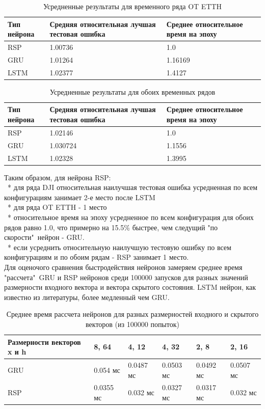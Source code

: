 \documentclass[11pt]{article}
\begin{document}
\begin{table}[H]
\caption{Усредненные результаты для временного ряда OT ETTH}
\begin{tabular}{ |p{2.2cm}|p{5cm}|p{5cm}|  }
 \hline
  Тип нейрона & Средняя относительная лучшая тестовая ошибка & Среднее относительное время на эпоху \\
  \hline
 RSP & 1.00736 & 1.0 \\
 \hline  
 GRU & 1.01264 & 1.16169 \\
 \hline 
 LSTM & 1.02377 & 1.4127 \\
 \hline
\end{tabular}
\end{table}

\begin{table}[H]
\caption{Усредненные результаты для обоих временных рядов}
\begin{tabular}{ |p{2.2cm}|p{5cm}|p{5cm}|  }
 \hline
  Тип нейрона & Средняя относительная лучшая тестовая ошибка & Среднее относительное время на эпоху \\
  \hline
 RSP & 1.02146 & 1.0 \\
 \hline  
 GRU & 1.030724 & 1.1556 \\
 \hline 
 LSTM & 1.02328 & 1.3995 \\
 \hline
\end{tabular}
\end{table}

Таким образом, для нейрона RSP:
\\
\-\ * для ряда DJI относительная наилучшая тестовая ошибка усредненная по всем конфигурациям занимает 2-е место после LSTM
\\
\-\ * для ряда OT ETTH - 1 место
\\
\-\ * относительное время на эпоху усредненное по всем конфигурация для обоих рядов равно 1.0, что примерно на 15.5\% быстрее, чем следущий "по скорости"\ нейрон - GRU.
\\ 
\-\ * если усреднить относительную наилучшую тестовую ошибку по всем конфигурациям и по обоим рядам - RSP занимает 1 место.
\\
Для оценочого сравнения быстродействия нейронов замеряем среднее время "рассчета"\ GRU и RSP нейронов среди 100000 запусков для разных значений размерности входного вектора и вектора скрытого состояния. LSTM нейрон, как известно из литературы, более медленный чем GRU.

\begin{table}[H]
\caption{Среднее время рассчета нейронов для разных размерностей входного и скрытого векторов (из 100000 попыток)}
\begin{tabular}{ |p{2cm}|p{2cm}|p{2cm}|p{2cm}|p{2cm}|p{2cm}|  }
 \hline
  Размерности векторов x и h & 8, 64 & 4, 12 &  4, 32 & 2, 8 & 2, 16 \\
  \hline
 GRU & 0.054 мс & 0.0487 мс & 0.0503 мс & 0.0492 мс & 0.0507 мс \\
 \hline 
 RSP & 0.0355 мс & 0.032 мс & 0.0327 мс & 0.0317 мс & 0.032 мс \\
 \hline
\end{tabular}
\end{table}
\end{document}

